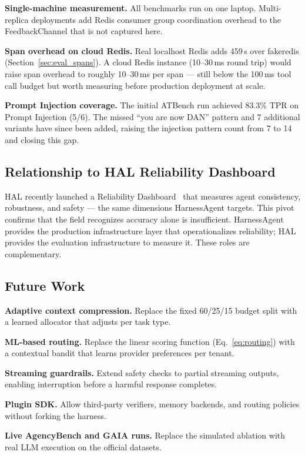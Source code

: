 \documentclass[conference]{IEEEtran}
\begin{document}
\textbf{Single-machine measurement.} All benchmarks run on one laptop.
Multi-replica deployments add Redis consumer group coordination overhead
to the FeedbackChannel that is not captured here.

\textbf{Span overhead on cloud Redis.} Real localhost Redis adds
459\,\textmu{}s over fakeredis (Section~\ref{sec:eval_spans}). A cloud
Redis instance (10--30\,ms round trip) would raise span overhead to
roughly 10--30\,ms per span — still below the 100\,ms tool call budget
but worth measuring before production deployment at scale.

\textbf{Prompt Injection coverage.} The initial ATBench run achieved
83.3\% TPR on Prompt Injection (5/6). The missed ``you are now DAN''
pattern and 7 additional variants have since been added, raising the
injection pattern count from 7 to 14 and closing this gap.

\subsection{Relationship to HAL Reliability Dashboard}

HAL recently launched a Reliability Dashboard~\cite{hal2025} that
measures agent consistency, robustness, and safety — the same
dimensions HarnessAgent targets. This pivot confirms that the field
recognizes accuracy alone is insufficient. HarnessAgent provides the
production infrastructure layer that operationalizes reliability; HAL
provides the evaluation infrastructure to measure it. These roles are
complementary.

\subsection{Future Work}

\textbf{Adaptive context compression.} Replace the fixed 60/25/15
budget split with a learned allocator that adjusts per task type.

\textbf{ML-based routing.} Replace the linear scoring function
(Eq.~\ref{eq:routing}) with a contextual bandit that learns provider
preferences per tenant.

\textbf{Streaming guardrails.} Extend safety checks to partial streaming
outputs, enabling interruption before a harmful response completes.

\textbf{Plugin SDK.} Allow third-party verifiers, memory backends, and
routing policies without forking the harness.

\textbf{Live AgencyBench and GAIA runs.} Replace the simulated ablation
with real LLM execution on the official datasets.
\end{document}
